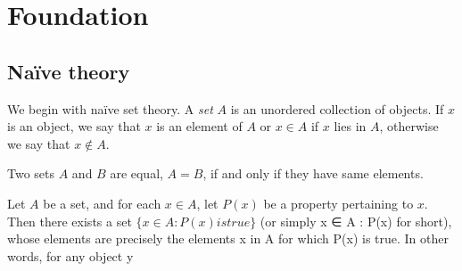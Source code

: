 
\chapter{Foundation}

\section{Na\"ive theory}

We begin with na\"ive set theory. A \emph{set} $A$ is an unordered collection of objects. If $x$ is an object, we say that $x$ is an element of $A$ or $x \in A$ if $x$ lies in $A$, otherwise we say that $x \notin A$.

\begin{axiom}[Extension]
    Two sets $A$ and $B$ are equal, $A = B$, if and only if they have same elements.
\end{axiom}

\begin{axiom}
    Let $A$ be a set, and for each $x \in A$, let $P(x)$ be a property pertaining to $x$. Then there exists a set $\{x ∈ A : P(x) is true\}$ (or simply {x ∈ A : P(x)} for short), whose elements are precisely the elements x in A for which P(x) is true. In other words, for any object y
\end{axiom}




